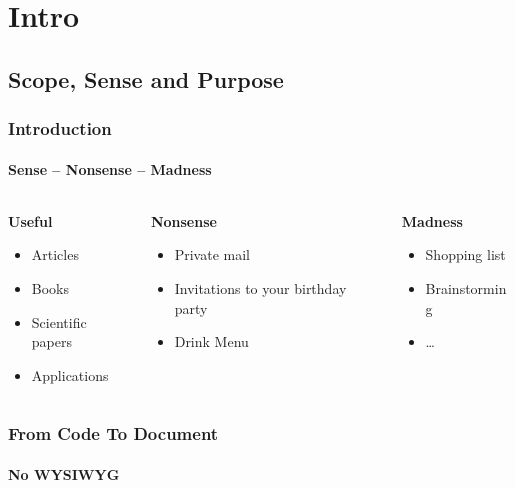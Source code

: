 \section{Intro} 

\subsection{Scope, Sense and Purpose}
\begin{frame}[t]
\frametitle{Introduction}
\framesubtitle{Sense -- Nonsense -- Madness}
\bigskip
\bigskip
\bigskip

\begin{columns}[t]
\begin{column}{.3\textwidth}
\textbf{Useful}\\[3mm]
\begin{itemize}
\item Articles
\item Books
\item Scientific papers
\item Applications
\end{itemize}
\end{column}
\begin{column}{.30\textwidth}
\textbf{Nonsense}\\[3mm]
\begin{itemize}
\item Private mail
\item Invitations to your birthday party
\item Drink Menu
\end{itemize}
\end{column}
\begin{column}{.3\textwidth}
\textbf{Madness}\\[3mm]
\begin{itemize}
\item Shopping list
\item Brainstorming
\item \ldots 
\end{itemize}
\end{column}
\end{columns}
\end{frame}


\begin{frame} 
\frametitle{From Code To Document}
\framesubtitle{No WYSIWYG} 
\begin{columns}
\begin{column}{.7\textwidth}
\end{column}
\begin{column}{.3\textwidth}
\end{column}
\end{columns}
\end{frame}

